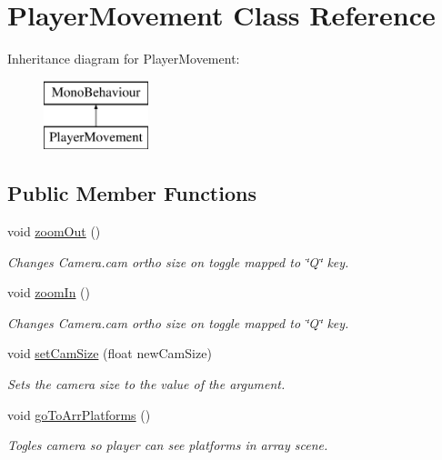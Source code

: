 \hypertarget{class_player_movement}{}\section{Player\+Movement Class Reference}
\label{class_player_movement}
Inheritance diagram for Player\+Movement\+:\begin{figure}[H]
\begin{center}
\leavevmode
\includegraphics[height=2.000000cm]{class_player_movement}
\end{center}
\end{figure}
\subsection*{Public Member Functions}
\begin{DoxyCompactItemize}
\item 
void \hyperlink{class_player_movement_a4801b0f4bea995d557faf3e0cf004b8b}{zoom\+Out} ()
\begin{DoxyCompactList}\small\item\em Changes Camera.\+cam ortho size on toggle mapped to \char`\"{}\+Q\char`\"{} key. \end{DoxyCompactList}\item 
void \hyperlink{class_player_movement_a86dee8b90e483c36b7190c80a53a4163}{zoom\+In} ()
\begin{DoxyCompactList}\small\item\em Changes Camera.\+cam ortho size on toggle mapped to \char`\"{}\+Q\char`\"{} key. \end{DoxyCompactList}\item 
void \hyperlink{class_player_movement_a53e0613db4bf57eb5edc2b9dacd7bfe5}{set\+Cam\+Size} (float new\+Cam\+Size)
\begin{DoxyCompactList}\small\item\em Sets the camera size to the value of the argument. \end{DoxyCompactList}\item 
void \hyperlink{class_player_movement_abd415fe1fd1e33f5fe5c28fa9ad97399}{go\+To\+Arr\+Platforms} ()
\begin{DoxyCompactList}\small\item\em Togles camera so player can see platforms in array scene. \end{DoxyCompactList}\end{DoxyCompactItemize}
